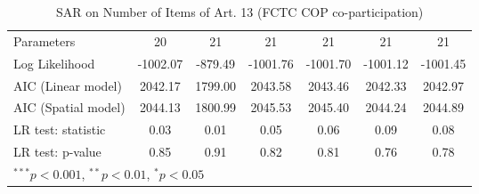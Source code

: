 \begin{table}[!h]
\begin{center}
\begin{tabular}{l c c c c c c }
Parameters              & 20           & 21           & 21           & 21           & 21           & 21           \\
Log Likelihood          & -1002.07     & -879.49      & -1001.76     & -1001.70     & -1001.12     & -1001.45     \\
AIC (Linear model)      & 2042.17      & 1799.00      & 2043.58      & 2043.46      & 2042.33      & 2042.97      \\
AIC (Spatial model)     & 2044.13      & 1800.99      & 2045.53      & 2045.40      & 2044.24      & 2044.89      \\
LR test: statistic      & 0.03         & 0.01         & 0.05         & 0.06         & 0.09         & 0.08         \\
LR test: p-value        & 0.85         & 0.91         & 0.82         & 0.81         & 0.76         & 0.78         \\
\bottomrule
\multicolumn{7}{l}{\scriptsize{$^{***}p<0.001$, $^{**}p<0.01$, $^*p<0.05$}}
\end{tabular}
\caption{SAR on Number of Items of Art. 13 (FCTC COP co-participation)}
\label{table:coefficients}
\end{center}
\end{table}
